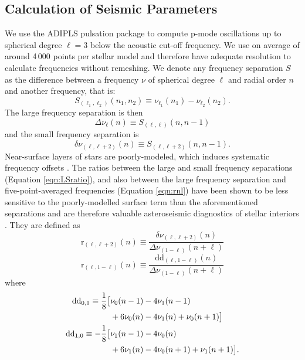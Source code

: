 \documentclass[manuscript,linenumbers]{aastex6}
\begin{document}
\subsection{Calculation of Seismic Parameters}
\label{sec:seis}
We use the ADIPLS pulsation package \citep{2008ApSS.316..113C} to compute p-mode oscillations up to spherical degree $\ell=3$ below the acoustic cut-off frequency. We use on average of around 4\,000 points per stellar model and therefore have adequate resolution to calculate frequencies without remeshing. We denote any frequency separation $S$ as the difference between a frequency $\nu$ of spherical degree $\ell$ and radial order $n$ and another frequency, that is: 
\begin{equation} 
  S_{(\ell_1, \ell_2)}(n_1, n_2) \equiv \nu_{\ell_1}(n_1) - \nu_{\ell_2}(n_2).
\end{equation}
The large frequency separation is then
\begin{equation} 
  \Delta\nu_\ell(n) \equiv S_{(\ell, \ell)}(n, n-1)
\end{equation}
and the small frequency separation is
\begin{equation}
  \delta\nu_{(\ell, \ell+2)}(n) \equiv S_{(\ell, \ell+2)}(n, n-1).
\end{equation}
Near-surface layers of stars are poorly-modeled, which induces systematic frequency offsets \citep[see e.g.][]{1999AA...351..689R}. The ratios between the large and small frequency separations (Equation \ref{eqn:LSratio}), and also between the large frequency separation and five-point-averaged frequencies (Equation \ref{eqn:rnl}) have been shown to be less sensitive to the poorly-modelled surface term than the aforementioned separations and are therefore valuable asteroseismic diagnostics of stellar interiors \citep{2003AA...411..215R}. They are defined as
\begin{equation} 
  \mathrm{r}_{(\ell,\ell+2)}(n) \equiv \frac{\delta\nu_{(\ell, \ell+2)}(n)}{\Delta\nu_{(1-\ell)}(n+\ell)} \label{eqn:LSratio}
\end{equation}
\begin{equation} 
  \mathrm{r}_{(\ell, 1-\ell)}(n) \equiv \frac{\mathrm{dd}_{(\ell,1-\ell)}(n)}{\Delta\nu_{(1-\ell)}(n+\ell)} \label{eqn:rnl}
\end{equation}
where
\begin{align} 
  \mathrm{dd}_{0,1} \equiv \frac{1}{8} \big[&\nu_0(n-1) - 4\nu_1(n-1) \notag\\
                                 &+6\nu_0(n) - 4\nu_1(n) + \nu_0(n+1)\big]\\ 
  \mathrm{dd}_{1,0} \equiv -\frac{1}{8} \big[&\nu_1(n-1) - 4\nu_0(n) \notag\\
                                 &+6\nu_1(n) - 4\nu_0(n+1) + \nu_1(n+1)\big].
\end{align}
\end{document}
